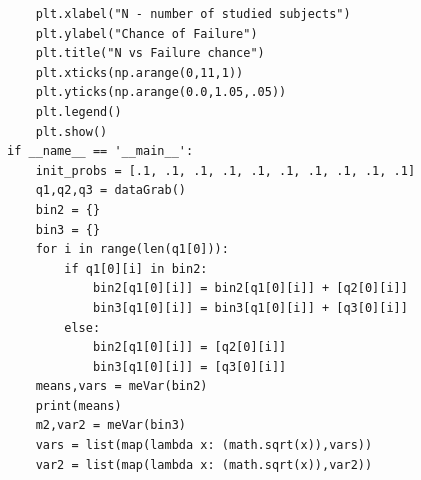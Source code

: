 \documentclass[10pt]{article} %
\begin{document}
\begin{verbatim}
    plt.xlabel("N - number of studied subjects")
    plt.ylabel("Chance of Failure")
    plt.title("N vs Failure chance")
    plt.xticks(np.arange(0,11,1))
    plt.yticks(np.arange(0.0,1.05,.05))
    plt.legend()
    plt.show()
if __name__ == '__main__':
    init_probs = [.1, .1, .1, .1, .1, .1, .1, .1, .1, .1]
    q1,q2,q3 = dataGrab()
    bin2 = {}
    bin3 = {}
    for i in range(len(q1[0])):
        if q1[0][i] in bin2:
            bin2[q1[0][i]] = bin2[q1[0][i]] + [q2[0][i]]
            bin3[q1[0][i]] = bin3[q1[0][i]] + [q3[0][i]]
        else:
            bin2[q1[0][i]] = [q2[0][i]]
            bin3[q1[0][i]] = [q3[0][i]]
    means,vars = meVar(bin2)
    print(means)
    m2,var2 = meVar(bin3)
    vars = list(map(lambda x: (math.sqrt(x)),vars))
    var2 = list(map(lambda x: (math.sqrt(x)),var2))
\end{verbatim}
\end{document}
